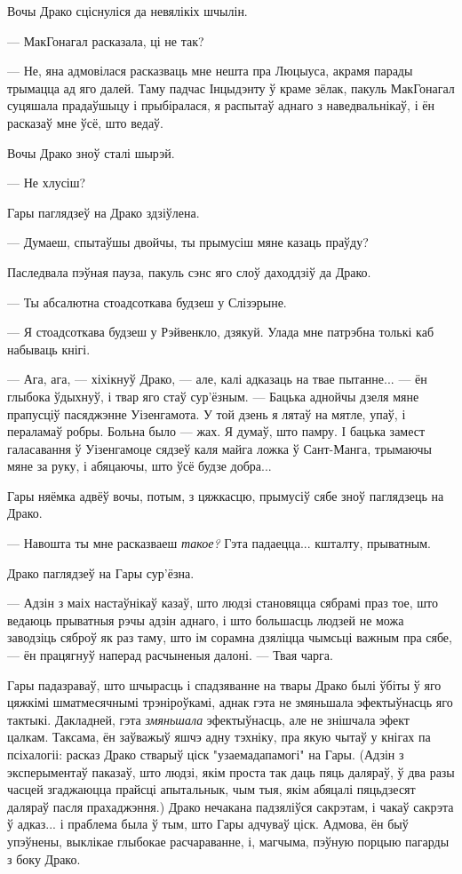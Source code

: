 Вочы Драко сціснуліся да невялікіх шчылін.

--- МакГонагал расказала, ці не так?

--- Не, яна адмовілася расказваць мне нешта пра Люцыуса, акрамя парады трымацца 
ад яго далей. Таму падчас Інцыдэнту ў краме зёлак, пакуль МакГонагал суцяшала 
прадаўшыцу і прыбіралася, я распытаў аднаго з наведвальнікаў, і ён расказаў мне 
ўсё, што ведаў.

Вочы Драко зноў сталі шырэй.

--- Не хлусіш?

Гары паглядзеў на Драко здзіўлена.

--- Думаеш, спытаўшы двойчы, ты прымусіш мяне казаць праўду?

Паследвала пэўная пауза, пакуль сэнс яго слоў даходдзіў да Драко.

--- Ты абсалютна стоадсоткава будзеш у Слізэрыне.

--- Я стоадсоткава будзеш у Рэйвенкло, дзякуй. Улада мне патрэбна толькі каб 
набываць кнігі.

--- Ага, ага, --- хіхікнуў Драко, --- але, калі адказаць на твае пытанне... ---
ён глыбока ўдыхнуў, і твар яго стаў сур'ёзным. --- Бацька аднойчы дзеля мяне 
прапусціў пасяджэнне Уізенгамота. У той дзень я лятаў на мятле, упаў, і пераламаў
робры. Больна было --- жах. Я думаў, што памру. І бацька замест галасавання ў 
Уізенгамоце сядзеў каля майга ложка ў Сант-Манга, трымаючы мяне за руку, і 
абяцаючы, што ўсё будзе добра...

Гары няёмка адвёў вочы, потым, з цяжкасцю, прымусіў сябе зноў паглядзець на Драко.

--- Навошта ты мне расказваеш \emph{такое?} Гэта падаецца... кшталту, прыватным.

Драко паглядзеў на Гары сур'ёзна. 

--- Адзін з маіх настаўнікаў казаў, што людзі становяцца сябрамі праз тое, што 
ведаюць прыватныя рэчы адзін аднаго, і што большасць людзей не можа 
заводзіць сяброў як раз таму, што ім сорамна дзяліцца чымсьці важным пра сябе, ---
ён працягнуў наперад расчыненыя далоні. --- Твая чарга.

Гары падазраваў, што шчырасць і спадзяванне на твары Драко былі
ўбіты ў яго цяжкімі шматмесячнымі трэніроўкамі, аднак гэта не змяньшала эфектыўнасць
яго тактыкі. Дакладней, гэта \emph{змяньшала} эфектыўнасць, але не знішчала 
эфект цалкам. Таксама, ён заўважыў яшчэ адну тэхніку, пра якую чытаў у кнігах
па псіхалогіі: расказ Драко стварыў ціск "узаемадапамогі" на Гары. (Адзін з
эксперыментаў паказаў, што людзі, якім проста так даць пяць даляраў,
ў два разы часцей згаджаюцца прайсці апытальнык, чым тыя, якім абяцалі пяцьдзесят
даляраў пасля прахаджэння.) Драко нечакана падзяліўся сакрэтам, і чакаў сакрэта 
ў адказ... і праблема была ў тым, што Гары адчуваў ціск. Адмова, ён быў упэўнены,
выклікае глыбокае расчараванне, і, магчыма, пэўную порцыю пагарды з боку Драко.

